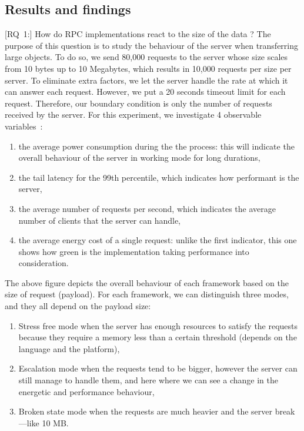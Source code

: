 \subsection{Results and findings}
[\textsc{RQ}~1:] How do RPC implementations react to the size of the data ?
The purpose of this question is to study the behaviour of the server when transferring large objects.
To do so, we send 80,000 requests to the server whose size scales from 10 bytes up to 10 Megabytes, which results in 10,000 requests per size per server.
To eliminate extra factors, we let the server handle the rate at which it can answer each request.
However, we put a 20 seconds timeout limit for each request.
Therefore, our boundary condition is only the number of requests received by the server.
For this experiment, we investigate 4 observable variables~:
\begin{enumerate}
    \item the \textsf{average power consumption} during the the process: this will indicate the overall behaviour of the server in working mode for long durations,
    \item the \textsf{tail latency} for the 99th percentile, which indicates how performant is the server,
    \item the \textsf{average number of requests per second}, which indicates the average number of clients that the server can handle,
    \item the \textsf{average energy cost} of a single request: unlike the first indicator, this one shows how green is the implementation taking performance into consideration.
\end{enumerate}

The above figure depicts the overall behaviour of each framework based on the size of request (payload).
For each framework, we can distinguish three modes, and they all depend on the payload size:
\begin{enumerate}
    \item \textsf{Stress free} mode when the server has enough resources to satisfy the requests because they require a memory less than a certain threshold (depends on the language and the platform),
    \item \textsf{Escalation} mode when the requests tend to be bigger, however the server can still manage to handle them, and here where we can see a change in the energetic and performance behaviour,
    \item \textsf{Broken state} mode when the requests are much heavier and the server break—like 10 MB.%
\end{enumerate}

